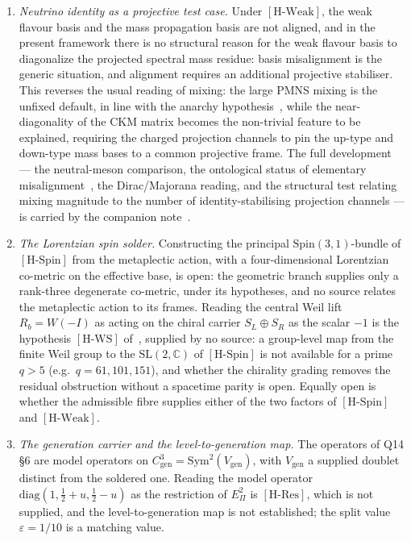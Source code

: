 \documentclass[11pt,a4paper]{article}
\theoremstyle{definition}
\newcommand{\Spin}{\mathrm{Spin}}
\newcommand{\SL}{\mathrm{SL}}
\newcommand{\Epi}{E_\Pi}
\newcommand{\Cgen}{C^3_{\mathrm{gen}}}
\newcommand{\HSpin}{\ensuremath{[\mathrm{H\text{-}Spin}]}}
\newcommand{\HWeak}{\ensuremath{[\mathrm{H\text{-}Weak}]}}
\newcommand{\HRes}{\ensuremath{[\mathrm{H\text{-}Res}]}}
\newcommand{\HWS}{\ensuremath{[\mathrm{H\text{-}WS}]}}
\begin{document}
\begin{enumerate}
        \item \textit{Neutrino identity as a projective test case.}
        Under \HWeak{}, the weak flavour basis and the mass propagation basis are not aligned, and in the present
        framework
        there is no structural reason for the weak flavour basis to diagonalize the projected spectral mass
        residue: basis misalignment is the generic situation, and alignment requires an additional projective
        stabiliser.
        This reverses the usual reading of mixing: the large PMNS mixing is the unfixed default, in line with
        the anarchy hypothesis~\cite{HallMurayamaWeiner2000}, while the near-diagonality of the CKM matrix
        becomes the non-trivial feature to be explained, requiring the charged projection channels to pin the
        up-type and down-type mass bases to a common projective frame.
        The full development --- the neutral-meson comparison, the ontological status of elementary
        misalignment~\cite{Hobart2026OnticTypes}, the Dirac/Majorana reading, and the structural test relating
        mixing magnitude to the number of identity-stabilising projection channels --- is carried by the
        companion note~\cite{Beau2026npi}.

        \item \textit{The Lorentzian spin solder.}
        Constructing the principal $\Spin(3,1)$-bundle of \HSpin{} from the metaplectic action, with a four-dimensional
        Lorentzian co-metric on the effective base, is open: the geometric branch supplies only a rank-three degenerate
        co-metric, under its hypotheses, and no source relates the metaplectic action to its frames.
        Reading the central Weil lift $R_b = W(-I)$ as acting on the chiral carrier $S_L\oplus S_R$ as the scalar $-1$
        is the hypothesis \HWS{} of~\cite{Beau2026q11of}, supplied by no source: a group-level map from the finite Weil
        group to the $\SL(2,\mathbb{C})$ of \HSpin{} is not available for a prime $q>5$ (e.g.\ $q=61,101,151$), and
        whether the chirality grading removes the residual
        obstruction without a spacetime parity is open.
        Equally open is whether the admissible fibre supplies either of the two factors of \HSpin{} and \HWeak{}.

        \item \textit{The generation carrier and the level-to-generation map.}
        The operators of Q14 \S6 are model operators on $\Cgen = \mathrm{Sym}^2(V_{\mathrm{gen}})$, with
        $V_{\mathrm{gen}}$ a supplied doublet distinct from the soldered one.
        Reading the model operator $\mathrm{diag}(1,\tfrac12+u,\tfrac12-u)$ as the restriction of $\Epi^2$ is
        \HRes{}, which is not supplied, and the level-to-generation map is not established; the split value
        $\varepsilon=1/10$ is a matching value.
      \end{enumerate}
\end{document}
